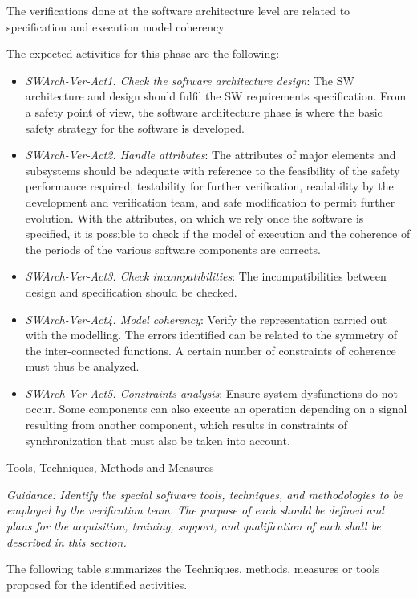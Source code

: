 \documentclass{template/openetcs_report}
\begin{document}
The verifications done at the software architecture level are related to specification and execution model coherency.

The expected activities for this phase are the following:
\begin{itemize}
\item {\it SWArch-Ver-Act1. Check the software architecture design}:
  The SW architecture and design should fulfil the SW requirements
  specification. From a safety point of view, the software
  architecture phase is where the basic safety strategy for the
  software is developed. 
\item {\it SWArch-Ver-Act2. Handle attributes}: The attributes of
  major elements and subsystems should be adequate with reference to
  the feasibility of the safety performance required, testability for
  further verification, readability by the development and
  verification team, and safe modification to permit further
  evolution. With the attributes, on which we rely once the software
  is specified, it is possible to check if the model of execution and
  the coherence of the periods of the various software components are
  corrects. 
\item {\it SWArch-Ver-Act3. Check incompatibilities}: The
  incompatibilities between design and specification should be
  checked.  
\item {\it SWArch-Ver-Act4. Model coherency}: Verify the
  representation carried out with the modelling. The errors identified
  can be related to the symmetry of the inter-connected functions. A
  certain number of constraints of coherence must thus be analyzed.  
\item {\it SWArch-Ver-Act5. Constraints analysis}: Ensure system
  dysfunctions do not occur. Some components can also execute an
  operation depending on a signal resulting from another component,
  which results in constraints of synchronization that must also be
  taken into account.  

\end{itemize}

\underline{Tools, Techniques, Methods and Measures} 

\textit{Guidance: Identify the special software tools, techniques, and methodologies to be employed by the verification team. 
The purpose of each should be defined and plans for the acquisition, training, support, and qualification of each shall be described in this section.}

The following table summarizes the Techniques, methods, measures or tools proposed for the identified activities.
\end{document}
